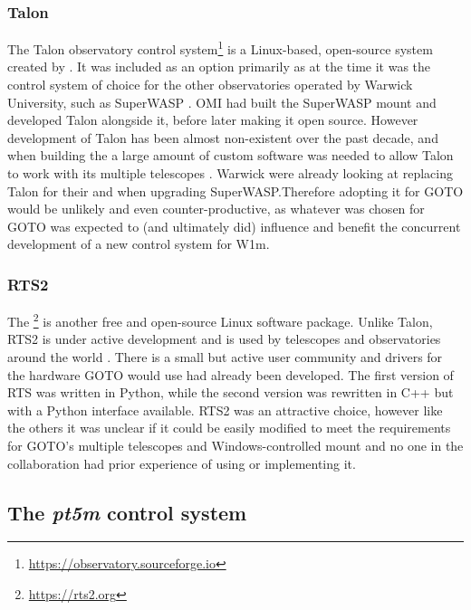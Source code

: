 \begin{colsection}
\begin{colsection}
\subsubsection{Talon}

The Talon observatory control system\footnote{\url{https://observatory.sourceforge.io}} is a Linux-based, open-source system created by . It was included as an option primarily as at the time it was the control system of choice for the other observatories operated by Warwick University, such as SuperWASP \citep{SuperWASP}. OMI had built the SuperWASP mount and developed Talon alongside it, before later making it open source. However development of Talon has been almost non-existent over the past decade, and when building the  a large amount of custom software was needed to allow Talon to work with its multiple telescopes \citep{ngts}. Warwick were already looking at replacing Talon for their  and when upgrading SuperWASP.\@ Therefore adopting it for GOTO would be unlikely and even counter-productive, as whatever was chosen for GOTO was expected to (and ultimately did) influence and benefit the concurrent development of a new control system for W1m.

\subsubsection{RTS2}

The \footnote{\url{https://rts2.org}} \citep{RTS2, RTS2b} is another free and open-source Linux software package. Unlike Talon, RTS2 is under active development and is used by telescopes and observatories around the world \citep{BORAT, BOOTES-3, antarctic, ARTN}. There is a small but active user community and drivers for the hardware GOTO would use had already been developed. The first version of RTS was written in Python, while the second version was rewritten in C++ but with a Python interface available. RTS2 was an attractive choice, however like the others it was unclear if it could be easily modified to meet the requirements for GOTO's multiple telescopes and Windows-controlled mount and no one in the collaboration had prior experience of using or implementing it.

\end{colsection}


\subsection{The \textit{pt5m} control system}
\label{sec:pt5m}
\begin{colsection}


\end{colsection}
\end{colsection}
